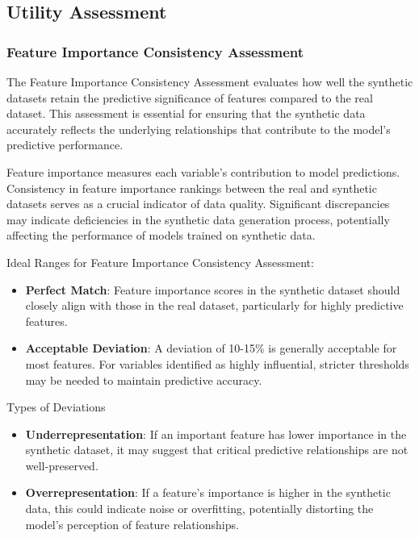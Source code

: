 \documentclass[
  letterpaper,
  DIV=11,
  numbers=noendperiod]{scrartcl}
\providecommand{\tightlist}{%
  \setlength{\itemsep}{0pt}\setlength{\parskip}{0pt}}\usepackage{longtable,booktabs,array}
\begin{document}
\subsection{Utility Assessment}\label{utility-assessment}

\subsubsection{Feature Importance Consistency
Assessment}\label{feature-importance-consistency-assessment}

The Feature Importance Consistency Assessment evaluates how well the
synthetic datasets retain the predictive significance of features
compared to the real dataset. This assessment is essential for ensuring
that the synthetic data accurately reflects the underlying relationships
that contribute to the model's predictive performance.

Feature importance measures each variable's contribution to model
predictions. Consistency in feature importance rankings between the real
and synthetic datasets serves as a crucial indicator of data quality.
Significant discrepancies may indicate deficiencies in the synthetic
data generation process, potentially affecting the performance of models
trained on synthetic data.

Ideal Ranges for Feature Importance Consistency Assessment:

\begin{itemize}
\tightlist
\item
  \textbf{Perfect Match}: Feature importance scores in the synthetic
  dataset should closely align with those in the real dataset,
  particularly for highly predictive features.
\item
  \textbf{Acceptable Deviation}: A deviation of 10-15\% is generally
  acceptable for most features. For variables identified as highly
  influential, stricter thresholds may be needed to maintain predictive
  accuracy.
\end{itemize}

Types of Deviations

\begin{itemize}
\tightlist
\item
  \textbf{Underrepresentation}: If an important feature has lower
  importance in the synthetic dataset, it may suggest that critical
  predictive relationships are not well-preserved.
\item
  \textbf{Overrepresentation}: If a feature's importance is higher in
  the synthetic data, this could indicate noise or overfitting,
  potentially distorting the model's perception of feature
  relationships.
\end{itemize}
\end{document}
